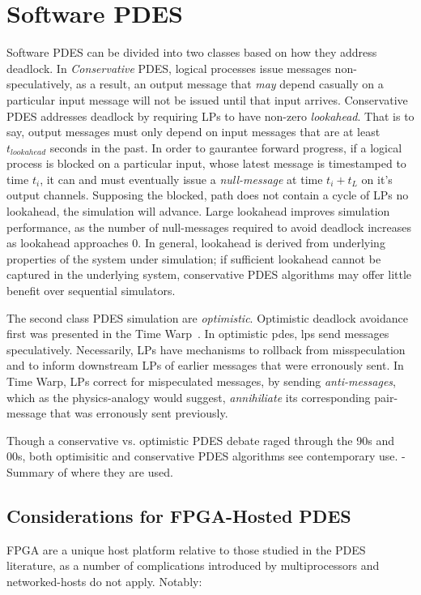 \section{Software PDES}
Software PDES can be divided into two classes based on how they address
deadlock.  In \emph{Conservative} PDES, logical processes issue messages
non-speculatively, as a result, an output message that \emph{may} depend casually on a
particular input message will not be issued until that input arrives.
Conservative PDES addresses deadlock by requiring LPs to have non-zero
\emph{lookahead}. That is to say, output messages must only depend on input
messages that are at least  $t_{lookahead}$ seconds in the past. In order to gaurantee forward
progress, if a logical process is blocked on a particular input, whose latest
message is timestamped to time $t_{i}$, it can and must eventually issue a
\emph{null-message} at time $t_{i} + t_{L}$ on it's output channels. Supposing
the blocked, path does not contain a cycle of LPs no lookahead, the simulation
will advance.  Large lookahead improves simulation performance, as the number
of null-messages required to avoid deadlock increases as lookahead approaches 0.
In general, lookahead is derived from underlying properties of the system under simulation;
if sufficient lookahead cannot be captured in the underlying system, conservative PDES algorithms may
offer little benefit over sequential simulators.

The second class PDES simulation are \emph{optimistic}. Optimistic deadlock
avoidance first was presented in the Time Warp~\cite{TimeWarp}. In optimistic
pdes, lps send messages speculatively. Necessarily, LPs have mechanisms to
rollback from misspeculation and to inform downstream LPs of earlier messages
that were erronously sent. In Time Warp, LPs correct for mispeculated messages,
by sending \emph{anti-messages}, which as the physics-analogy would suggest,
\emph{annihiliate} its corresponding pair-message that was erronously sent previously.

Though a conservative vs. optimistic PDES debate raged through
the 90s and 00s, both optimisitic and conservative PDES algorithms see
contemporary use.
- Summary of where they are used.

\subsection{Considerations for FPGA-Hosted PDES}

FPGA are a unique host platform relative to those studied in the PDES
literature, as a number of complications introduced by multiprocessors and
networked-hosts do not apply. Notably:

